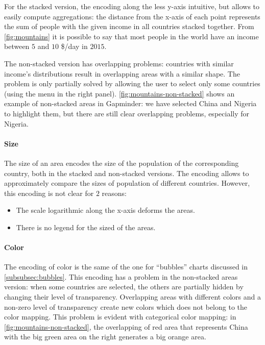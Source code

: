 For the stacked version, the encoding along the less y-axis intuitive, but allows to easily compute aggregations:
the distance from the x-axis of each point represents the sum of people with the given income in all countries stacked together.
From \cref{fig:mountains} it is possible to say that most people in the world have an income between $5$ and $10$ \$/day in $2015$.

The non-stacked version has overlapping problems:
countries with similar income's distributions result in overlapping areas with a similar shape.
The problem is only partially solved by allowing the user to select only some countries (using the menu in the right panel).
\cref{fig:mountains-non-stacked} shows an example of non-stacked areas in Gapminder:
we have selected China and Nigeria to highlight them, but there are still clear overlapping problems, especially for Nigeria.

\paragraph{Size}
The size of an area encodes the size of the population of the corresponding country, both in the stacked and non-stacked versions.
The encoding allows to approximately compare the sizes of population of different countries.
However, this encoding is not clear for $2$ reasons:
\begin{itemize}
	\item The scale logarithmic along the x-axis deforms the areas.
	\item There is no legend for the sized of the areas.
\end{itemize}

\paragraph{Color}
The encoding of color is the same of the one for ``bubbles'' charts discussed in \cref{subsubsec:bubbles}.
This encoding has a problem in the non-stacked areas version:
when some countries are selected, the others are partially hidden by changing their level of transparency.
Overlapping areas with different colors and a non-zero level of transparency create new colors which does not belong to the color mapping.
This problem is evident with categorical color mapping:
in \cref{fig:mountains-non-stacked}, the overlapping of red area that represents China with the big green area on the right generates a big orange area.


